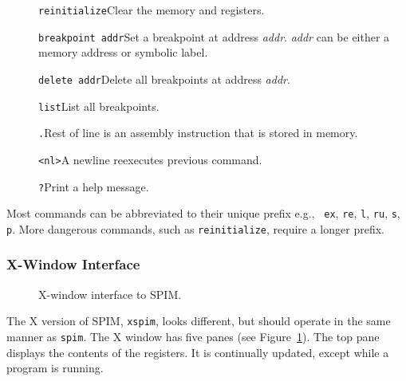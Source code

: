 \begin{description}
  \item [] {\tt reinitialize}\newline Clear the memory and registers.

  \item [] {\tt breakpoint addr}\newline Set a breakpoint at address
{\em addr\/}.  {\em addr\/} can be either a memory address or symbolic
label.

  \item [] {\tt delete addr}\newline Delete all breakpoints at address
{\em addr\/}.

  \item [] {\tt list}\newline List all breakpoints.

  \item [] {\tt .}\newline Rest of line is an assembly instruction
that is stored in memory.

  \item [] {\tt <nl>}\newline A newline reexecutes previous command.

  \item [] {\tt ?}\newline Print a help message.
\end{description}

Most commands can be abbreviated to their unique prefix e.g., {\tt
ex}, {\tt re}, {\tt l}, {\tt ru}, {\tt s}, {\tt p}.  More dangerous
commands, such as {\tt reinitialize}, require a longer prefix.

\subsubsection{X-Window Interface}

\begin{figure}
  \centerline{}
  \caption{X-window interface to SPIM.}
  \label{fig:xinterface}
\end{figure}
The X version of SPIM, {\tt xspim}, looks different, but should
operate in the same manner as {\tt spim}.  The X window has five panes
(see Figure~\ref{fig:xinterface}).  The top pane displays the contents
of the registers.  It is continually updated, except while a program
is running.

